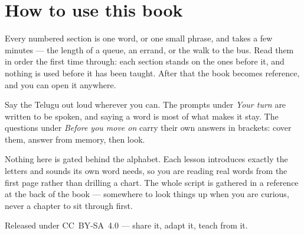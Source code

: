 \documentclass[11pt,twoside]{book}
\begin{document}
\section*{How to use this book}

Every numbered section is one word, or one small phrase, and takes a few
minutes --- the length of a queue, an errand, or the walk to the bus. Read them
in order the first time through: each section stands on the ones before it, and
nothing is used before it has been taught. After that the book becomes
reference, and you can open it anywhere.

Say the Telugu out loud wherever you can. The prompts under \emph{Your turn}
are written to be spoken, and saying a word is most of what makes it stay. The
questions under \emph{Before you move on} carry their own answers in brackets:
cover them, answer from memory, then look.

Nothing here is gated behind the alphabet. Each lesson introduces exactly the
letters and sounds its own word needs, so you are reading real words from the
first page rather than drilling a chart. The whole script is gathered in a
reference at the back of the book --- somewhere to look things up when you are
curious, never a chapter to sit through first.

Released under CC~BY-SA~4.0 --- share it, adapt it, teach from it.

\tableofcontents

\mainmatter


\end{document}
